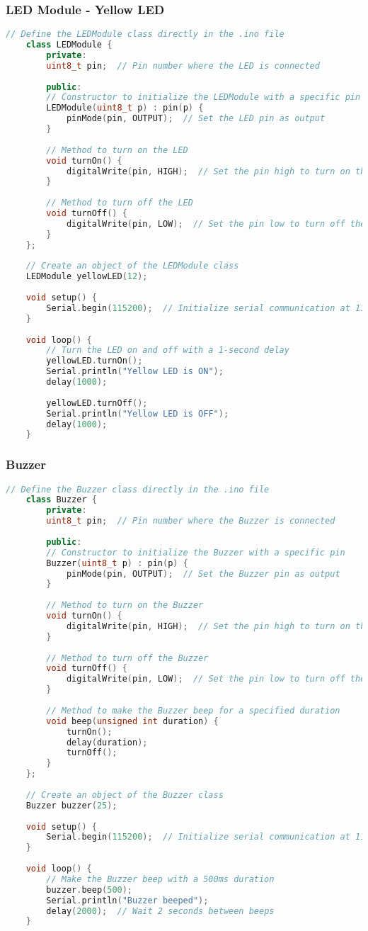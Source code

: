 \subsubsection*{LED Module - Yellow LED}
\begin{lstlisting}[language=C++]
	// Define the LEDModule class directly in the .ino file
	class LEDModule {
		private:
		uint8_t pin;  // Pin number where the LED is connected
		
		public:
		// Constructor to initialize the LEDModule with a specific pin
		LEDModule(uint8_t p) : pin(p) {
			pinMode(pin, OUTPUT);  // Set the LED pin as output
		}
		
		// Method to turn on the LED
		void turnOn() {
			digitalWrite(pin, HIGH);  // Set the pin high to turn on the LED
		}
		
		// Method to turn off the LED
		void turnOff() {
			digitalWrite(pin, LOW);  // Set the pin low to turn off the LED
		}
	};
	
	// Create an object of the LEDModule class
	LEDModule yellowLED(12);
	
	void setup() {
		Serial.begin(115200);  // Initialize serial communication at 115200 baud rate
	}
	
	void loop() {
		// Turn the LED on and off with a 1-second delay
		yellowLED.turnOn();
		Serial.println("Yellow LED is ON");
		delay(1000);
		
		yellowLED.turnOff();
		Serial.println("Yellow LED is OFF");
		delay(1000);
	}
\end{lstlisting}
\clearpage
\subsubsection*{Buzzer}
\begin{lstlisting}[language=C++]
	// Define the Buzzer class directly in the .ino file
	class Buzzer {
		private:
		uint8_t pin;  // Pin number where the Buzzer is connected
		
		public:
		// Constructor to initialize the Buzzer with a specific pin
		Buzzer(uint8_t p) : pin(p) {
			pinMode(pin, OUTPUT);  // Set the Buzzer pin as output
		}
		
		// Method to turn on the Buzzer
		void turnOn() {
			digitalWrite(pin, HIGH);  // Set the pin high to turn on the Buzzer
		}
		
		// Method to turn off the Buzzer
		void turnOff() {
			digitalWrite(pin, LOW);  // Set the pin low to turn off the Buzzer
		}
		
		// Method to make the Buzzer beep for a specified duration
		void beep(unsigned int duration) {
			turnOn();
			delay(duration);
			turnOff();
		}
	};
	
	// Create an object of the Buzzer class
	Buzzer buzzer(25);
	
	void setup() {
		Serial.begin(115200);  // Initialize serial communication at 115200 baud rate
	}
	
	void loop() {
		// Make the Buzzer beep with a 500ms duration
		buzzer.beep(500);
		Serial.println("Buzzer beeped");
		delay(2000);  // Wait 2 seconds between beeps
	}
\end{lstlisting}
\clearpage
